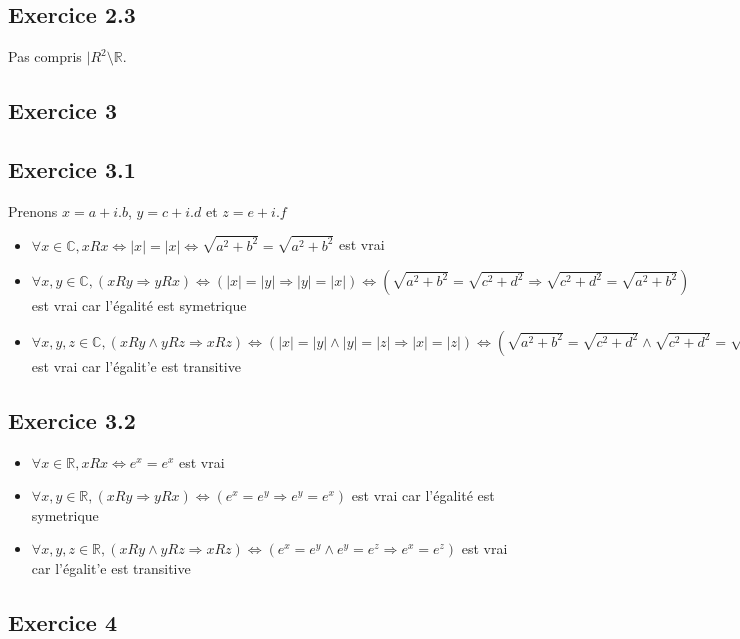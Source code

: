 \documentclass[]{book}
\theoremstyle{definition}
\newcommand{\bb}[1]{\mathbb{#1}}
\newcommand{\R}{\bb{R}}
\newcommand{\C}{\bb{C}}
\begin{document}
\subsection*{Exercice 2.3}
Pas compris $|R^2\setminus\R$.


\subsection*{Exercice 3}
\subsection*{Exercice 3.1}
Prenons $x=a+i.b$, $y=c+i.d $ et $z=e+i.f$
\begin{itemize}
\item $\forall x \in \C, xRx \Leftrightarrow |x| = |x| \Leftrightarrow \sqrt{a^2+b^2} = \sqrt{a^2+b^2} $  est vrai
\item $\forall x,y \in \C, (xRy \Rightarrow yRx) \Leftrightarrow (|x| = |y| \Rightarrow |y| = |x|) \Leftrightarrow (\sqrt{a^2+b^2} = \sqrt{c^2+d^2} \Rightarrow \sqrt{c^2+d^2} = \sqrt{a^2+b^2})$ est vrai car l'\'egalit\'e est symetrique
\item $\forall x,y,z \in \C, (xRy \wedge yRz \Rightarrow xRz) \Leftrightarrow (|x| = |y| \wedge |y| = |z| \Rightarrow |x| = |z|) \Leftrightarrow (\sqrt{a^2+b^2} = \sqrt{c^2+d^2} \wedge \sqrt{c^2+d^2} = \sqrt{e^2+f^2} \Rightarrow \sqrt{a^2+b^2} = \sqrt{e^2+f^2})$ est vrai car l'\'egalit'e est transitive
\end{itemize}


\subsection*{Exercice 3.2}
\begin{itemize}
\item $\forall x \in \R, xRx \Leftrightarrow e^x = e^x$ est vrai
\item $\forall x,y \in \R, (xRy \Rightarrow yRx) \Leftrightarrow (e^x = e^y \Rightarrow e^y = e^x)$ est vrai car l'\'egalit\'e est symetrique
\item $\forall x,y,z \in \R, (xRy \wedge yRz \Rightarrow xRz) \Leftrightarrow (e^x = e^y \wedge e^y = e^z \Rightarrow e^x = e^z)$ est vrai car l'\'egalit'e est transitive
\end{itemize}

\subsection*{Exercice 4}
\end{document}
